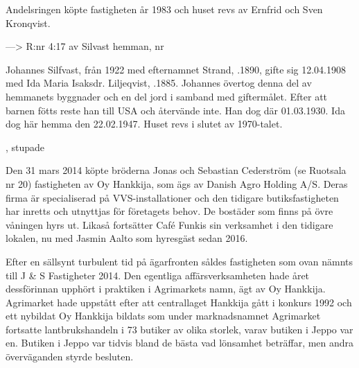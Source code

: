 Andelsringen köpte fastigheten år 1983 och huset revs av Ernfrid och Sven Kronqvist.


---> R:nr 4:17 av Silvast hemman, nr 


Johannes Silfvast, från 1922 med efternamnet Strand, .1890, gifte sig 12.04.1908 med Ida Maria Isaksdr. Liljeqvist, .1885. Johannes övertog denna del av hemmanets byggnader och en del jord i samband med giftermålet. Efter att barnen fötts reste han till USA och återvände inte. Han dog där 01.03.1930. Ida dog här hemma den 22.02.1947. Huset revs i slutet av 1970-talet.
\begin{jhchildren}
  \item {}
  \item {}
  \item {}
  \item {}
  \item {}, stupade
  \item {}
\end{jhchildren}




Den 31 mars 2014 köpte bröderna Jonas och Sebastian Cederström (se Ruotsala nr 20) fastigheten av Oy Hankkija, som ägs av Danish Agro Holding A/S. Deras firma är specialiserad på VVS-installationer och den tidigare butiksfastigheten har inretts och utnyttjas för företagets behov. De bostäder som finns på övre våningen hyrs ut. Likaså fortsätter Café Funkis sin verksamhet i den tidigare lokalen, nu med Jasmin Aalto som hyresgäst sedan 2016.


Efter en sällsynt turbulent tid på ägarfronten såldes fastigheten som ovan nämnts till J \& S Fastigheter 2014. Den egentliga affärsverksamheten hade året dessförinnan upphört i praktiken i Agrimarkets namn, ägt av Oy Hankkija. Agrimarket hade uppstått efter att centrallaget Hankkija gått i konkurs 1992 och ett nybildat Oy Hankkija bildats som under marknadsnamnet Agrimarket fortsatte lantbrukshandeln i 73 butiker av olika storlek, varav butiken i Jeppo var en. Butiken i Jeppo var tidvis bland de bästa vad lönsamhet beträffar, men andra överväganden styrde besluten.

